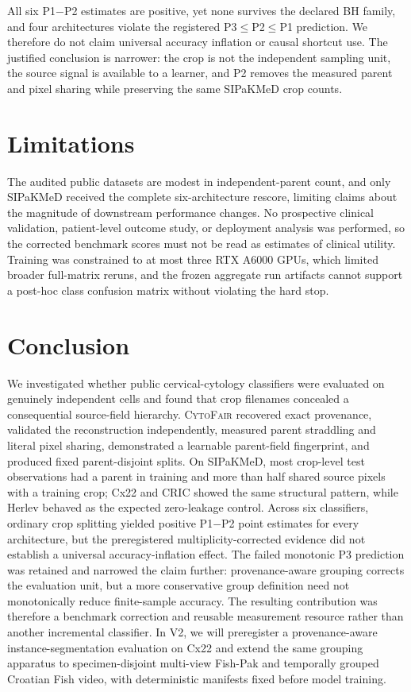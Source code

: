 \documentclass[conference]{IEEEtran}
\newcommand{\protocol}[1]{\textsf{#1}}
\newcommand{\cytofair}{\textsc{CytoFair}}
\begin{document}
All six \protocol{P1}$-$\protocol{P2} estimates are positive, yet none survives the declared BH family, and four architectures violate the registered \protocol{P3}$\leq$\protocol{P2}$\leq$\protocol{P1} prediction.
We therefore do not claim universal accuracy inflation or causal shortcut use.
The justified conclusion is narrower: the crop is not the independent sampling unit, the source signal is available to a learner, and \protocol{P2} removes the measured parent and pixel sharing while preserving the same SIPaKMeD crop counts.

\section{Limitations}
The audited public datasets are modest in independent-parent count, and only SIPaKMeD received the complete six-architecture rescore, limiting claims about the magnitude of downstream performance changes.
No prospective clinical validation, patient-level outcome study, or deployment analysis was performed, so the corrected benchmark scores must not be read as estimates of clinical utility.
Training was constrained to at most three RTX A6000 GPUs, which limited broader full-matrix reruns, and the frozen aggregate run artifacts cannot support a post-hoc class confusion matrix without violating the hard stop.

\section{Conclusion}
We investigated whether public cervical-cytology classifiers were evaluated on genuinely independent cells and found that crop filenames concealed a consequential source-field hierarchy.
\cytofair{} recovered exact provenance, validated the reconstruction independently, measured parent straddling and literal pixel sharing, demonstrated a learnable parent-field fingerprint, and produced fixed parent-disjoint splits.
On SIPaKMeD, most crop-level test observations had a parent in training and more than half shared source pixels with a training crop; Cx22 and CRIC showed the same structural pattern, while Herlev behaved as the expected zero-leakage control.
Across six classifiers, ordinary crop splitting yielded positive \protocol{P1}$-$\protocol{P2} point estimates for every architecture, but the preregistered multiplicity-corrected evidence did not establish a universal accuracy-inflation effect.
The failed monotonic \protocol{P3} prediction was retained and narrowed the claim further: provenance-aware grouping corrects the evaluation unit, but a more conservative group definition need not monotonically reduce finite-sample accuracy.
The resulting contribution was therefore a benchmark correction and reusable measurement resource rather than another incremental classifier.
In V2, we will preregister a provenance-aware instance-segmentation evaluation on Cx22 and extend the same grouping apparatus to specimen-disjoint multi-view Fish-Pak and temporally grouped Croatian Fish video, with deterministic manifests fixed before model training.


{\scriptsize}
\end{document}
